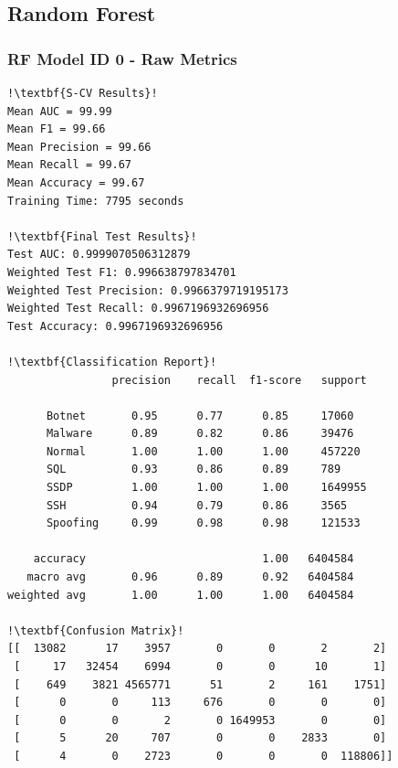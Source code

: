 \begin{appendices}
\newpage

\subsection{Random Forest}
\label{appx:Random Forest}

\subsubsection{RF Model ID 0 - Raw Metrics}
\begin{lstlisting}[escapechar=!]
!\textbf{S-CV Results}!
Mean AUC = 99.99
Mean F1 = 99.66
Mean Precision = 99.66
Mean Recall = 99.67
Mean Accuracy = 99.67
Training Time: 7795 seconds

!\textbf{Final Test Results}!
Test AUC: 0.9999070506312879
Weighted Test F1: 0.996638797834701
Weighted Test Precision: 0.9966379719195173
Weighted Test Recall: 0.9967196932696956
Test Accuracy: 0.9967196932696956

!\textbf{Classification Report}!
                precision    recall  f1-score   support

      Botnet       0.95      0.77      0.85     17060
      Malware      0.89      0.82      0.86     39476
      Normal       1.00      1.00      1.00     457220
      SQL          0.93      0.86      0.89     789
      SSDP         1.00      1.00      1.00     1649955
      SSH          0.94      0.79      0.86     3565
      Spoofing     0.99      0.98      0.98     121533

    accuracy                           1.00   6404584
   macro avg       0.96      0.89      0.92   6404584
weighted avg       1.00      1.00      1.00   6404584

!\textbf{Confusion Matrix}!
[[  13082      17    3957       0       0       2       2]
 [     17   32454    6994       0       0      10       1]
 [    649    3821 4565771      51       2     161    1751]
 [      0       0     113     676       0       0       0]
 [      0       0       2       0 1649953       0       0]
 [      5      20     707       0       0    2833       0]
 [      4       0    2723       0       0       0  118806]]
\end{lstlisting}


\end{appendices}

